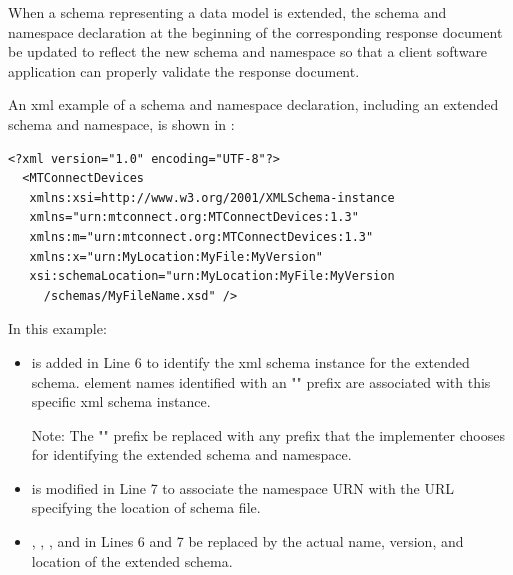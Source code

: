 When a \gls{schema} representing a \gls{data model} is extended, the \gls{schema} and \gls{namespace} declaration at the beginning of the corresponding \gls{response document} \MUST be updated to reflect the new \gls{schema} and \gls{namespace} so that a client software application can properly validate the \gls{response document}.

An \gls{xml} example of a \gls{schema} and \gls{namespace} declaration, including an extended \gls{schema} and \gls{namespace}, is shown in :

\begin{lstlisting}[firstnumber=1,escapechar=|,%
caption={Example of extended schema and namespace in declaration}, label={lst:extended-schema-and-namespace-declaration}]
<?xml version="1.0" encoding="UTF-8"?>
  <MTConnectDevices
   xmlns:xsi=http://www.w3.org/2001/XMLSchema-instance
   xmlns="urn:mtconnect.org:MTConnectDevices:1.3"
   xmlns:m="urn:mtconnect.org:MTConnectDevices:1.3"
   xmlns:x="urn:MyLocation:MyFile:MyVersion"
   xsi:schemaLocation="urn:MyLocation:MyFile:MyVersion
     /schemas/MyFileName.xsd" />
\end{lstlisting}

In this example:

\begin{itemize}

\item {} is added in Line 6 to identify the \gls{xml schema} instance for the extended \gls{schema}.   \glspl{element name} identified with an "" prefix are associated with this specific \gls{xml schema} instance.

\begin{note}
Note: The "" prefix \MAY be replaced with any prefix that the implementer chooses for identifying the extended \gls{schema} and \gls{namespace}.

\end{note}

\item {} is modified in Line 7 to associate the \gls{namespace} URN with the URL specifying the location of \gls{schema} file.

\item {}, , , and  in Lines 6 and 7 \MUST be replaced by the actual name, version, and location of the extended \gls{schema}.

\end{itemize}

